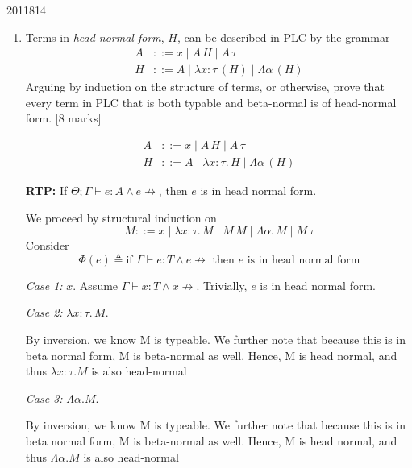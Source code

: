\documentclass[10pt,\jkfside,a4paper]{article}
\newcommand{\answer}[1]{
    \begin{tcolorbox}[colframe=black, colback=white, sharp corners, boxrule=0.2mm, breakable]
        #1
    \end{tcolorbox}
}
\newcommand{\qmarks}[1]{\hspace*{\fill}[#1]}
\begin{document}
\begin{examquestion}{2011}{8}{14}
\begin{enumerate}
{                \[\frac{M \to M'}{\lambda x:A. M \to \lambda x:A . M'}\]
            }

        \item
            Terms in \emph{head-normal form}, $H$, can be described in PLC by the grammar
            \begin{align*}
                A &::= x \mid A\,H \mid A\,\tau \\
                H &::= A \mid \lambda x : \tau\, (H) \mid \Lambda \alpha\, (H)
            \end{align*}
            Arguing by induction on the structure of terms, or otherwise, prove that
            every term in PLC that is both typable and beta-normal is of head-normal
            form. \qmarks{8 marks}

            \answer{
                \begin{align*}
                    A &::= x \mid A\,H \mid A\,\tau \\
                    H &::= A \mid \lambda x : \tau.\, H \mid \Lambda \alpha\, (H)
                \end{align*}

                \textbf{RTP:} If $\Theta; \Gamma \vdash e : A \wedge e \not\to$, then $e$ is in head normal form.

                We proceed by structural induction on
                \[
                    M ::= x \mid \lambda x : \tau.\, M \mid M\,M \mid \Lambda \alpha.\, M \mid M\,\tau
                \]
                Consider
                \[
                    \Phi(e) \triangleq \text{if } \Gamma \vdash e : T \wedge e \not\to \text{ then } e \text{ is in head normal form}
                \]

                \textit{Case 1:} $x$. Assume $\Gamma \vdash x : T \wedge x \not\to$. Trivially, $e$ is in head normal form.

                \textit{Case 2:} $\lambda x : \tau.\, M$. 

                By inversion, we know M is typeable. We further note that because this is in beta normal form, M is beta-normal as well. Hence, M is head normal, and thus $\lambda x: \tau.M$ is also head-normal

                \textit{Case 3:} $\Lambda \alpha. M$. 

                By inversion, we know M is typeable. We further note that because this is in beta normal form, M is beta-normal as well. Hence, M is head normal, and thus $\Lambda \alpha.M$ is also head-normal

}
\end{enumerate}
\end{examquestion}
\end{document}

